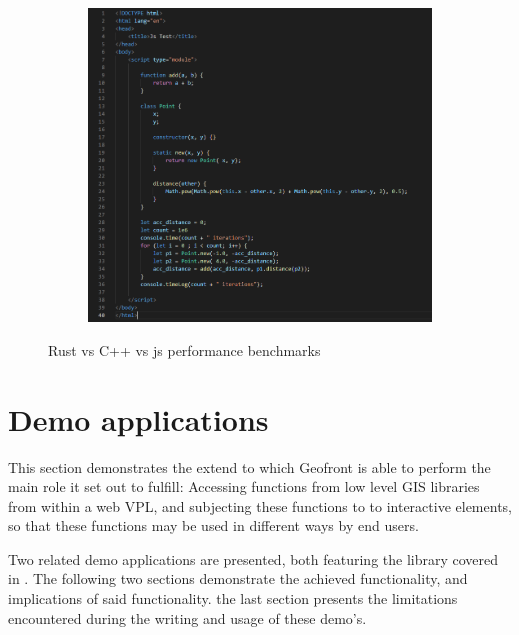\begin{figure}
\begin{subfigure}[b]{0.32\linewidth}
    \caption{}
  \end{subfigure}%
  \qquad
  \begin{subfigure}[b]{0.32\linewidth}
    \graphicspath{{../../assets/images/6.1.5/}}
    \centering
    \includegraphics[width=\linewidth]{js.PNG}
    \caption{}
  \end{subfigure}%
  \caption[benchmark]{Rust vs C++ vs js performance benchmarks}
  \label{fig:perf-benchmark}
\end{figure}


\section{Demo applications}
\label{sec:testing:demo}
This section demonstrates the extend to which Geofront is able to perform the main role it set out to fulfill: 
Accessing functions from low level \ac{GIS} libraries from within a web VPL, and subjecting these functions to to interactive elements, so that these functions may be used in different ways by end users.

Two related demo applications are presented, both featuring the  library covered in .
The following two sections demonstrate the achieved functionality, and implications of said functionality. 
the last section presents the limitations encountered during the writing and usage of these demo's.

